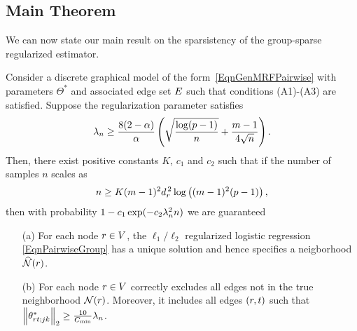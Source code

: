\subsection{Main Theorem}

We can now state our main result on the sparsistency of the group-sparse regularized estimator.
\begin{theorem}\label{ThmPairwise}
Consider a discrete graphical model of the form~\eqref{EqnGenMRFPairwise} with parameters $\Theta^*$ and associated edge set $E$ such that conditions (A1)-(A3) are satisfied. Suppose the regularization parameter satisfies
\begin{equation}
\lambda_n\geq\frac{8(2-\alpha)}{\alpha}\left(\sqrt{\frac{\log(p-1)}{n}}+\frac{m-1}{4\sqrt{n}}\right).
\end{equation}
Then, there exist positive constants $K$, $c_1$ and $c_2$ such that if the number of samples $n$ scales as
\begin{equation}
n\geq K (m-1)^2 d_{r}^{\,2} \log\left((m-1)^2(p-1)\right),
\end{equation}
then with probability $1-c_1\exp(-c_2\lambda_n^2n)$ we are guaranteed
\begin{itemize}
\item [(a)] For each node $r\in V$, the $\ell_1/\ell_2$ regularized logistic regression \eqref{EqnPairwiseGroup} has a unique solution and hence specifies a neigborhood $\widehat{\mathcal{N}}(r)$.
\item [(b)] For each node $r\in V$ correctly excludes all edges not in the true neighborhood $\mathcal{N}(r)$. Moreover, it includes all edges $(r,t)$ such that $\left\|\theta^*_{r t;jk}\right\|_{2}\geq\frac{10}{C_{\min}}\lambda_n$.\\
\end{itemize}

\end{theorem}



